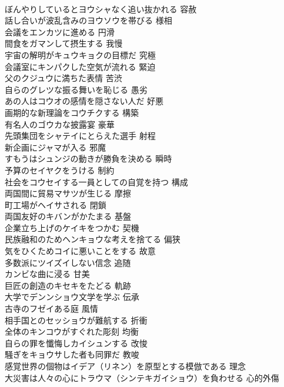 \documentclass[8pt]{extreport}
\begin{document}
\begin{CJK}{UTF8}{min}
\\	ぼんやりしているとヨウシャなく追い抜かれる	容赦
\\	話し合いが波乱含みのヨウソウを帯びる	様相
\\	会議をエンカツに進める	円滑
\\	間食をガマンして摂生する	我慢
\\	宇宙の解明がキュウキョクの目標だ	究極
\\	会議室にキンパクした空気が流れる	緊迫
\\	父のクジュウに満ちた表情	苦渋
\\	自らのグレツな振る舞いを恥じる	愚劣
\\	あの人はコウオの感情を隠さない人だ	好悪
\\	画期的な新理論をコウチクする	構築
\\	有名人のゴウカな披露宴	豪華
\\	先頭集団をシャテイにとらえた選手	射程
\\	新企画にジャマが入る	邪魔
\\	すもうはシュンジの動きが勝負を決める	瞬時
\\	予算のセイヤクをうける	制約
\\	社会をコウセイする一員としての自覚を持つ	構成
\\	両国間に貿易マサツが生じる	摩擦
\\	町工場がヘイサされる	閉鎖
\\	両国友好のキバンがかたまる	基盤
\\	企業立ち上げのケイキをつかむ	契機
\\	民族融和のためヘンキョウな考えを捨てる	偏狭
\\	気をひくためコイに悪いことをする	故意
\\	多数派にツイズイしない信念	追随
\\	カンビな曲に浸る	甘美
\\	巨匠の創造のキセキをたどる	軌跡
\\	大学でデンンショウ文学を学ぶ	伝承
\\	古寺のフゼイある庭	風情
\\	相手国とのセッショウが難航する	折衝
\\	全体のキンコウがすぐれた彫刻	均衡
\\	自らの罪を懺悔しカイシュンする	改悛
\\	騒ぎをキョウサした者も同罪だ	教唆
\\	感覚世界の個物はイデア（リネン）を原型とする模倣である	理念
\\	大災害は人々の心にトラウマ（シンテキガイショウ）を負わせる	心的外傷

\end{CJK}
\end{document}
